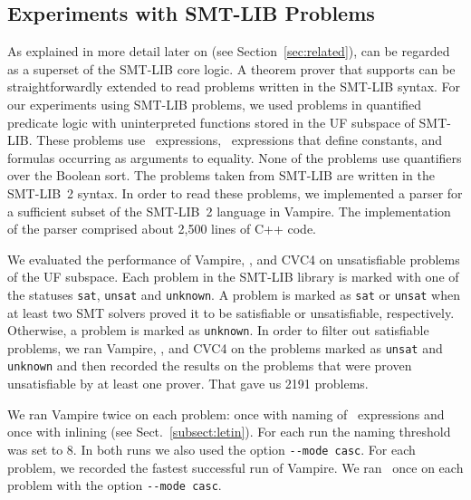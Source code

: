 \subsection{Experiments with SMT-LIB Problems}\label{subsec:SMT}
As explained in more detail later on (see Section~\ref{sec:related}), \folb{} can be regarded as a superset of the SMT-LIB core logic.
A theorem prover that supports \folb{} can be straightforwardly extended to read problems written in the SMT-LIB syntax.
%
For our experiments using SMT-LIB problems, we used problems in quantified predicate logic with uninterpreted functions stored in the UF subspace of SMT-LIB.
These problems use \ITE\ expressions, \LETIN\ expressions that define constants, and formulas 
occurring as arguments to equality. None of the problems use quantifiers over the Boolean sort. 
 The  problems taken from SMT-LIB are written in the SMT-LIB~2
 syntax. In order to read these problems, we implemented a parser for
 a sufficient subset of the SMT-LIB~2 language in Vampire. The
 implementation of the parser comprised about 2,500 lines of C++ code. 

We evaluated the performance of Vampire, \oldcnfVampire, and CVC4 on unsatisfiable problems of the UF subspace. Each problem in the SMT-LIB library is marked with one of the statuses \verb'sat', \verb'unsat' and \verb'unknown'. A problem is marked as \verb'sat' or \verb'unsat' 
when at least two SMT solvers proved it to be satisfiable or unsatisfiable, respectively.
Otherwise, a problem is marked as \verb'unknown'. In order to filter out satisfiable problems,
we ran Vampire, \oldcnfVampire, and CVC4 on the problems marked as \verb'unsat' and \verb'unknown' and then recorded the results on the problems that were proven unsatisfiable by at least one prover. That gave us 2191 problems.

We ran Vampire twice on each problem: once with naming of \LETIN\ expressions and once with inlining (see Sect.~\ref{subsect:letin}).
For each run the naming threshold was set to 8. In both runs we also used the option \verb'--mode casc'. For each problem, we recorded the fastest successful run of Vampire. We ran \oldcnfVampire\ once on each problem with the option \verb'--mode casc'.

